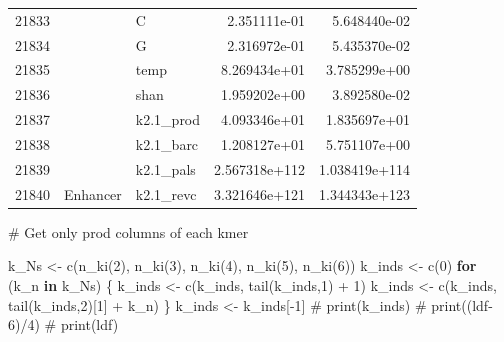 \documentclass[
  letterpaper,
]{article}
\newenvironment{Shaded}{\begin{snugshade}}{\end{snugshade}}
\newcommand{\CommentTok}[1]{\textcolor[rgb]{0.37,0.37,0.37}{#1}}
\newcommand{\ControlFlowTok}[1]{\textcolor[rgb]{0.00,0.23,0.31}{\textbf{#1}}}
\newcommand{\DecValTok}[1]{\textcolor[rgb]{0.68,0.00,0.00}{#1}}
\newcommand{\FunctionTok}[1]{\textcolor[rgb]{0.28,0.35,0.67}{#1}}
\newcommand{\NormalTok}[1]{\textcolor[rgb]{0.00,0.23,0.31}{#1}}
\newcommand{\OtherTok}[1]{\textcolor[rgb]{0.00,0.23,0.31}{#1}}
\newcommand{\SpecialCharTok}[1]{\textcolor[rgb]{0.37,0.37,0.37}{#1}}
\begin{document}
\begin{table}[!h]
{\begin{tabular}[t]{lllrr}
\rowcolor{brown!25}
21833 & \cellcolor{brown!25} & C & 2.351111e-01 & 5.648440e-02\\[-0.12pt]
\rowcolor{brown!10}
21834 & \cellcolor{brown!25} & G & 2.316972e-01 & 5.435370e-02\\[-0.12pt]
\rowcolor{brown!25}
21835 & \cellcolor{brown!25} & temp & 8.269434e+01 & 3.785299e+00\\[-0.12pt]
\rowcolor{brown!10}
21836 & \cellcolor{brown!25} & shan & 1.959202e+00 & 3.892580e-02\\[-0.12pt]
\rowcolor{brown!25}
21837 & \cellcolor{brown!25} & k2.1\_prod & 4.093346e+01 & 1.835697e+01\\[-0.12pt]
\rowcolor{brown!10}
21838 & \cellcolor{brown!25} & k2.1\_barc & 1.208127e+01 & 5.751107e+00\\[-0.12pt]
\rowcolor{brown!25}
21839 & \cellcolor{brown!25} & k2.1\_pals & 2.567318e+112 & 1.038419e+114\\[-0.12pt]
\rowcolor{brown!10}
21840 & \multirow{-10}{*}{\raggedright\arraybackslash\cellcolor{brown!25} Enhancer} & k2.1\_revc & 3.321646e+121 & 1.344343e+123\\[-0.12pt]
\bottomrule
\end{tabular}}
\renewcommand{\arraystretch}{1}

\end{table}

\begin{Shaded}
\begin{Highlighting}[]
\CommentTok{\# Get only \textquotesingle{}prod\textquotesingle{} columns of each kmer}

\NormalTok{k\_Ns }\OtherTok{\textless{}{-}} \FunctionTok{c}\NormalTok{(}\FunctionTok{n\_ki}\NormalTok{(}\DecValTok{2}\NormalTok{), }\FunctionTok{n\_ki}\NormalTok{(}\DecValTok{3}\NormalTok{), }\FunctionTok{n\_ki}\NormalTok{(}\DecValTok{4}\NormalTok{), }\FunctionTok{n\_ki}\NormalTok{(}\DecValTok{5}\NormalTok{), }\FunctionTok{n\_ki}\NormalTok{(}\DecValTok{6}\NormalTok{)) }
\NormalTok{k\_inds }\OtherTok{\textless{}{-}} \FunctionTok{c}\NormalTok{(}\DecValTok{0}\NormalTok{)}
\ControlFlowTok{for}\NormalTok{ (k\_n }\ControlFlowTok{in}\NormalTok{ k\_Ns) \{}
\NormalTok{  k\_inds }\OtherTok{\textless{}{-}} \FunctionTok{c}\NormalTok{(k\_inds, }\FunctionTok{tail}\NormalTok{(k\_inds,}\DecValTok{1}\NormalTok{) }\SpecialCharTok{+} \DecValTok{1}\NormalTok{)}
\NormalTok{  k\_inds }\OtherTok{\textless{}{-}} \FunctionTok{c}\NormalTok{(k\_inds, }\FunctionTok{tail}\NormalTok{(k\_inds,}\DecValTok{2}\NormalTok{)[}\DecValTok{1}\NormalTok{] }\SpecialCharTok{+}\NormalTok{ k\_n)}
\NormalTok{\}}
\NormalTok{k\_inds }\OtherTok{\textless{}{-}}\NormalTok{ k\_inds[}\SpecialCharTok{{-}}\DecValTok{1}\NormalTok{]}
\CommentTok{\# print(k\_inds)}
\CommentTok{\# print((ldf{-}6)/4)}
\CommentTok{\# print(ldf)}
\end{Highlighting}
\end{Shaded}
\end{document}
